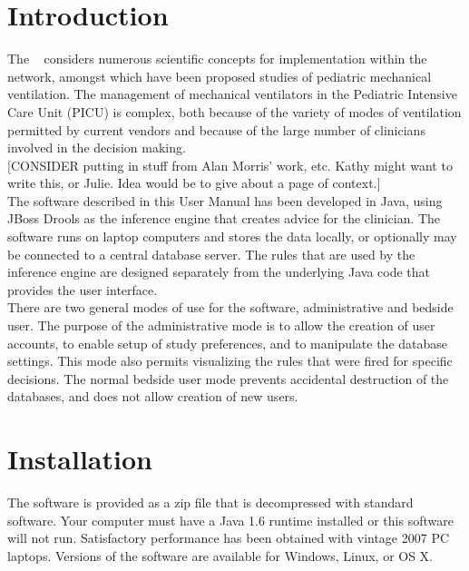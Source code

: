 
\section{Introduction}
The \abb~ considers numerous scientific concepts for implementation within the network,
amongst which have been proposed studies of pediatric mechanical ventilation.  The management
of mechanical ventilators in the Pediatric Intensive Care Unit (PICU) is complex, both because of
the variety of modes of ventilation permitted by current vendors and because of the large
number of clinicians involved in the decision making.\\

[CONSIDER putting in stuff from Alan Morris' work, etc.  Kathy might want to write this, or Julie.  Idea
would be to give about a page of context.]\\

The software described in this User Manual has been developed in Java, using JBoss Drools as the inference
engine that creates advice for the clinician.  The software runs on laptop computers and stores the data locally, or
optionally may be connected to a central database server.  The rules that are used by the inference engine are designed
separately from the underlying Java code that provides the user interface.\\

There are two general modes of use for the software, administrative and bedside user.  The purpose of the administrative
mode is to allow the creation of user accounts, to enable setup of study preferences, and to manipulate the database
settings.  This mode also permits visualizing the rules that were fired for specific decisions.  The normal bedside user
mode prevents accidental destruction of the databases, and does not allow creation of new users.\\



\section{Installation}

The software is provided as a zip file that is decompressed with standard software.  Your computer must have a Java 1.6 
runtime installed or this software will not run.  Satisfactory performance has been obtained with vintage 2007 PC laptops.
Versions of the software are available for Windows, Linux, or OS X.\\

